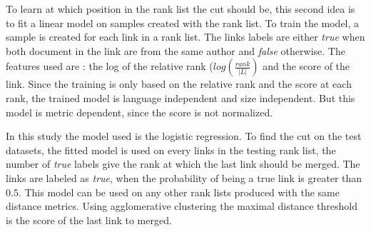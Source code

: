 To learn at which position in the rank list the cut should be, this second idea is to fit a linear model on samples created with the rank list.
To train the model, a sample is created for each link in a rank list.
The links labels are either \textit{true} when both document in the link are from the same author and \textit{false} otherwise.
The features used are : the log of the relative rank ($log(\frac{rank}{|L|})$ and the score of the link.
Since the training is only based on the relative rank and the score at each rank, the trained model is language independent and size independent.
But this model is metric dependent, since the score is not normalized.

In this study the model used is the logistic regression.
To find the cut on the test datasets, the fitted model is used on every links in the testing rank list, the number of \textit{true} labels give the rank at which the last link should be merged.
The links are labeled as \textit{true}, when the probability of being a true link is greater than $0.5$.
This model can be used on any other rank lists produced with the same distance metrics.
Using agglomerative clustering the maximal distance threshold is the score of the last link to merged.
